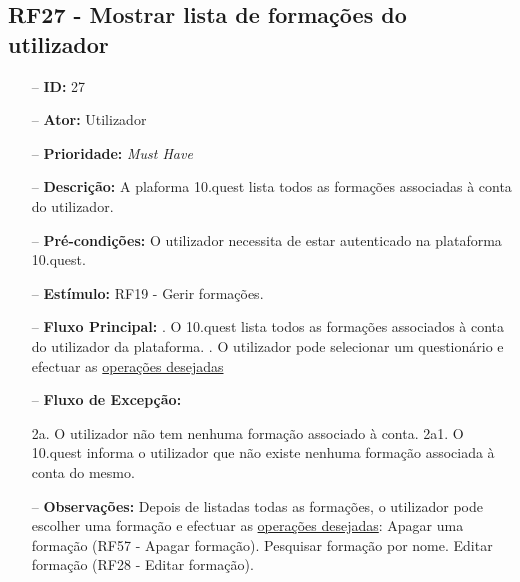 \subsection{RF27 - Mostrar lista de formações do utilizador}
\begin{itemize}
	\item[--] \textbf{ID:} 27
	\item[--]  \textbf{Ator:} Utilizador
	\item[--]  \textbf{Prioridade:} \textit{Must Have}
	\item[--]  \textbf{Descrição:} A plaforma 10.quest lista todos as formações associadas à conta do utilizador.
	\item[--]  \textbf{Pré-condições:} O utilizador necessita de estar autenticado na plataforma 10.quest.
	\item[--]  \textbf{Estímulo:} RF19 - Gerir formações.
	\item[--]  \textbf{Fluxo Principal:} 
		. O 10.quest lista todos as formações associados à conta do utilizador da plataforma.
		. O utilizador pode selecionar um questionário e efectuar as \underline{operações desejadas}
	\item[--]  \textbf{Fluxo de Excepção:} 
		\begin{comment}
		\subitem 1. O 10.quest efetua um pedido da lista de formações associados à conta do utilizador, ao TCG.
		\subitem 1a. O 10.quest não consegue efetuar o pedido à API do TCG devido a uma falha na conexão.
		\subitem 1a1. O 10.quest notifica o utilizador que ocorreu uma falha na conexão.
		\subitem 1b. O serviço do TCG (API) está indisponível.
		\subitem 1b1. O 10.quest notifica o utilizador que o serviço do TCG está temporariamente indisponível. 
		\end{comment}
		\subitem 2a. O utilizador não tem nenhuma formação associado à conta.
		\subitem 2a1. O 10.quest informa o utilizador que não existe nenhuma formação associada à conta do mesmo.
	\item[--]  \textbf{Observações:} Depois de listadas todas as formações, o utilizador pode escolher uma formação e efectuar as \underline{operações desejadas}:
		\subitem Apagar uma formação (RF57 - Apagar formação).
		\subitem Pesquisar formação por nome.
		\subitem Editar formação (RF28 - Editar formação).
\end{itemize}
\newpage

